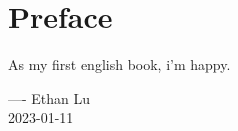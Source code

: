 \thispagestyle{empty}
\chapter*{Preface}
As my first english book, i'm happy.

\hfill ---- Ethan Lu\\ 
\phantom{\rule{.8\linewidth+.1em}{0pt}}  2023-01-11
\begin{center}
    \vfill
    \thepage
\end{center}
\let\cleardoublepage\clearpage